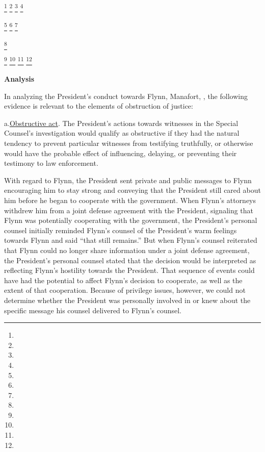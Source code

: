 
\footnote{}
\footnote{}
\footnote{}
\footnote{}

\footnote{}
\footnote{}
\footnote{}

\footnote{}

\footnote{}
\footnote{}
\footnote{}
\footnote{}

\begin{center}
\textbf{Analysis}
\end{center}

In analyzing the President's conduct towards Flynn, Manafort, , the following evidence is relevant to the elements of obstruction of justice:

a.\qquad\underline{Obstructive act}.
The President's actions towards witnesses in the Special Counsel's investigation would qualify as obstructive if they had the natural tendency to prevent particular witnesses from testifying truthfully, or otherwise would have the probable effect of influencing, delaying, or preventing their testimony to law enforcement.

With regard to Flynn, the President sent private and public messages to Flynn encouraging him to stay strong and conveying that the President still cared about him before he began to cooperate with the government.
When Flynn's attorneys withdrew him from a joint defense agreement with the President, signaling that Flynn was potentially cooperating with the government, the President's personal counsel initially reminded Flynn's counsel of the President's warm feelings towards Flynn and said ``that still remains.''
But when Flynn's counsel reiterated that Flynn could no longer share information under a joint defense agreement, the President's personal counsel stated that the decision would be interpreted as reflecting Flynn's hostility towards the President.
That sequence of events could have had the potential to affect Flynn's decision to cooperate, as well as the extent of that cooperation.
Because of privilege issues, however, we could not determine whether the President was personally involved in or knew about the specific message his counsel delivered to Flynn's counsel.

